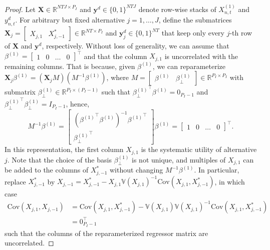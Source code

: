 \documentclass[preprint,12pt,authoryear]{elsarticle}
\newcommand{\R}{\mathbb{R}}
\newcommand{\Var}{\mathbb{V}}
\newcommand{\Cov}{\text{Cov}}
\begin{document}
\begin{proof}
Let $\bm{X} \in \R^{NTJ\times P_I}$ and $\bm{y}^d\in\{0,1\}^{NTJ}$ denote row-wise stacks of $X^{(1)}_{n,t}$ and $y_{n,t}^d$. For arbitrary but fixed alternative $j = 1,\dots,J$, define the submatrices $\bm{X}_j = \begin{bmatrix} X_{j,1} & X_{j,-1}^*\end{bmatrix} \in \R^{NT\times P_I}$ and $\bm{y}_j^d\in\{0,1\}^{NT}$ that keep only every $j$-th row of $\bm{X}$ and $\bm{y}^d$, respectively. Without loss of generality, we can assume that $\beta^{(1)} = \begin{bmatrix} 1 & 0 & \dots & 0 \end{bmatrix}^\top$ and that the column $X_{j,1}$ is uncorrelated with the remaining columns. That is because, given $\beta^{(1)}$, we can reparameterize $\bm{X}_{j} \beta^{(1)} = (\bm{X}_{j} M) (M^{-1} \beta^{(1)})$, where $M = \begin{bmatrix} \beta^{(1)} & \beta^{(1)}_\perp \end{bmatrix} \in \R^{P_I \times P_I}$ with submatrix $\beta^{(1)}_\perp \in \R^{P_I \times (P_I-1)}$ such that ${\beta^{(1)}_\perp}^\top \beta^{(1)} = 0_{P_I - 1}$ and ${\beta^{(1)}_\perp}^\top \beta^{(1)}_\perp = I_{P_I - 1}$, hence,
%
$$
M^{-1}\beta^{(1)} = \begin{bmatrix} \left({\beta^{(1)}}^\top\beta^{(1)}\right)^{-1} {\beta^{(1)}}^\top \\  {\beta^{(1)}_\perp}^\top \end{bmatrix} \beta^{(1)} = \begin{bmatrix} 1 & 0 & \dots & 0 \end{bmatrix}^\top.
$$
%
In this representation, the first column $X_{j,1}$ is the systematic utility of alternative $j$. Note that the choice of the basis $\beta^{(1)}_\perp$ is not unique, and multiples of $X_{j,1}$ can be added to the columns of $X_{j,-1}^*$ without changing $M^{-1}\beta^{(1)}$. In particular, replace $X_{j,-1}^*$ by $X_{j,-1} = X_{j,-1}^* - X_{j,1} \Var(X_{j,1})^{-1} \Cov(X_{j,1}, X_{j,-1}^*)$, in which case
%
\begin{align*}
    \Cov(X_{j,1}, X_{j,-1}) &= \Cov(X_{j,1}, X_{j,-1}^*) - \Var(X_{j,1}) \Var(X_{j,1})^{-1} \Cov(X_{j,1}, X_{j,-1}^*) \\
    &= 0_{P_I - 1}^\top
\end{align*}
%
such that the columns of the reparameterized regressor matrix are uncorrelated.


\end{proof}
\end{document}
